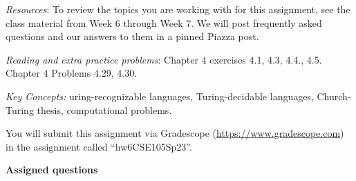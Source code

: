 \textit{Resources}:  To review the topics you are working with for this assignment, 
see the class material from Week 6 through Week 7. We will post frequently asked questions 
and our answers to them in a pinned Piazza post.

\textit{Reading and extra practice problems}: Chapter 4 exercises 4.1, 4.3, 4.4., 4.5. 
Chapter 4 Problems 4.29, 4.30.

\textit{Key Concepts:} uring-recognizable languages, Turing-decidable languages, 
Church-Turing thesis, computational problems.

\instructions

You will submit this assignment via Gradescope
(\href{https://www.gradescope.com}{https://www.gradescope.com}) 
in the assignment called ``hw6CSE105Sp23''.

\textbf{Assigned questions}

